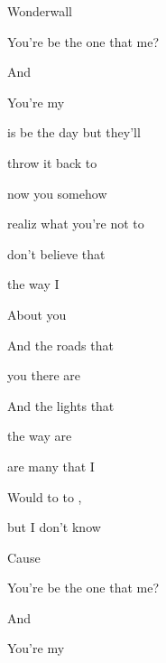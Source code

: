 \begin{SBSong}{Wonderwall}
\begin{SBVerse}
    You're  be the one that   me?  
    
    And     
    
    You're my     
  \end{SBVerse}
  \begin{SBVerse}
     is  be the day but they'll 
    
     throw it back to 
    
     now you  somehow 
    
    realiz what you're not to 
    
     don't believe that 
 
     the way I 
    
    About you   
  \end{SBVerse}
  \begin{SBVerse}
    And  the roads that 
    
     you there are 
    
    And  the lights that 
    
     the way are 
    
     are many  that I 
    
    Would  to  to ,
 
    but I don't know 
  \end{SBVerse}
  \begin{SBVerse}
    Cause   
    
    You're  be the one that   me?  
    
    And     
    
    You're my      
  \end{SBVerse}
\end{SBSong}
